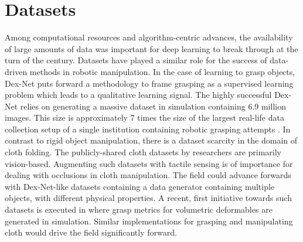 \documentclass[\home/main.tex]{subfiles}
\begin{document}
\section{Datasets}
Among computational resources and algorithm-centric advances, the availability of large amounts of data was important for deep learning to break through at the turn of the century. Datasets have played a similar role for the success of data-driven methods in robotic manipulation. In the case of learning to grasp objects, Dex-Net \autocite{dexnet2} puts forward a methodology to frame grasping as a supervised learning problem which leads to a qualitative learning signal. The highly successful Dex-Net relies on generating a massive dataset in simulation containing 6.9 million images. This size is approximately 7 times the size of the largest real-life data collection setup of a single institution containing robotic grasping attempts \autocite{Levine2016}. In contrast to rigid object manipulation, there is a dataset scarcity in the domain of cloth folding. The publicly-shared cloth datasets by researchers are primarily vision-based. Augmenting such datasets with tactile sensing is of importance for dealing with occlusions in cloth manipulation. The field could advance forwards with Dex-Net-like datasets containing a data generator containing multiple objects, with different physical properties. A recent, first initiative towards such datasets is executed in \textcite{DefGraspSim} where grasp metrics for volumetric deformables are generated in simulation. Similar implementations for grasping and manipulating cloth would drive the field significantly forward. 
\end{document}
